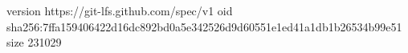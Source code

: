 version https://git-lfs.github.com/spec/v1
oid sha256:7ffa159406422d16dc892bd0a5e342526d9d60551e1ed41a1db1b26534b99e51
size 231029
